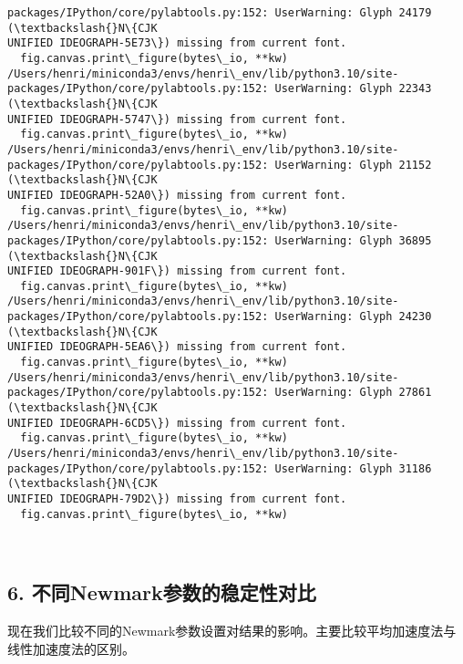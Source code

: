 \documentclass[11pt]{article}
\begin{document}
\begin{Verbatim}[commandchars=\\\{\}]
packages/IPython/core/pylabtools.py:152: UserWarning: Glyph 24179 (\textbackslash{}N\{CJK
UNIFIED IDEOGRAPH-5E73\}) missing from current font.
  fig.canvas.print\_figure(bytes\_io, **kw)
/Users/henri/miniconda3/envs/henri\_env/lib/python3.10/site-
packages/IPython/core/pylabtools.py:152: UserWarning: Glyph 22343 (\textbackslash{}N\{CJK
UNIFIED IDEOGRAPH-5747\}) missing from current font.
  fig.canvas.print\_figure(bytes\_io, **kw)
/Users/henri/miniconda3/envs/henri\_env/lib/python3.10/site-
packages/IPython/core/pylabtools.py:152: UserWarning: Glyph 21152 (\textbackslash{}N\{CJK
UNIFIED IDEOGRAPH-52A0\}) missing from current font.
  fig.canvas.print\_figure(bytes\_io, **kw)
/Users/henri/miniconda3/envs/henri\_env/lib/python3.10/site-
packages/IPython/core/pylabtools.py:152: UserWarning: Glyph 36895 (\textbackslash{}N\{CJK
UNIFIED IDEOGRAPH-901F\}) missing from current font.
  fig.canvas.print\_figure(bytes\_io, **kw)
/Users/henri/miniconda3/envs/henri\_env/lib/python3.10/site-
packages/IPython/core/pylabtools.py:152: UserWarning: Glyph 24230 (\textbackslash{}N\{CJK
UNIFIED IDEOGRAPH-5EA6\}) missing from current font.
  fig.canvas.print\_figure(bytes\_io, **kw)
/Users/henri/miniconda3/envs/henri\_env/lib/python3.10/site-
packages/IPython/core/pylabtools.py:152: UserWarning: Glyph 27861 (\textbackslash{}N\{CJK
UNIFIED IDEOGRAPH-6CD5\}) missing from current font.
  fig.canvas.print\_figure(bytes\_io, **kw)
/Users/henri/miniconda3/envs/henri\_env/lib/python3.10/site-
packages/IPython/core/pylabtools.py:152: UserWarning: Glyph 31186 (\textbackslash{}N\{CJK
UNIFIED IDEOGRAPH-79D2\}) missing from current font.
  fig.canvas.print\_figure(bytes\_io, **kw)
    \end{Verbatim}

    \begin{center}
    \end{center}
    { \hspace*{\fill} \\}
    
    \subsection{6.
不同Newmark参数的稳定性对比}\label{ux4e0dux540cnewmarkux53c2ux6570ux7684ux7a33ux5b9aux6027ux5bf9ux6bd4}

现在我们比较不同的Newmark参数设置对结果的影响。主要比较平均加速度法与线性加速度法的区别。
\end{document}
